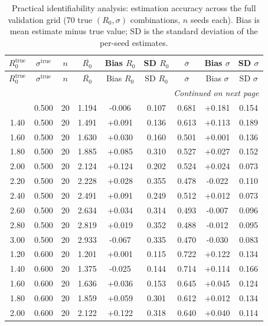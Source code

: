 \begin{longtable}{ccccccccc}
\caption{Practical identifiability analysis: estimation accuracy across the full validation grid (70 true $(R_0,\sigma)$ combinations, $n$ seeds each). Bias is mean estimate minus true value; SD is the standard deviation of the per-seed estimates.} \label{tab:s1_identifiability} \\
\hline
$R_0^{\text{true}}$ & $\sigma^{\text{true}}$ & $n$ & $\overline{R_0}$ & Bias $R_0$ & SD $R_0$ & $\overline{\sigma}$ & Bias $\sigma$ & SD $\sigma$ \\
\hline
\endfirsthead
\hline
$R_0^{\text{true}}$ & $\sigma^{\text{true}}$ & $n$ & $\overline{R_0}$ & Bias $R_0$ & SD $R_0$ & $\overline{\sigma}$ & Bias $\sigma$ & SD $\sigma$ \\
\hline
\endhead
\hline \multicolumn{9}{r}{\textit{Continued on next page}} \\
\endfoot
\hline
\endlastfoot
1.20 & 0.500 & 20 & 1.194 & -0.006 & 0.107 & 0.681 & +0.181 & 0.154 \\
1.40 & 0.500 & 20 & 1.491 & +0.091 & 0.136 & 0.613 & +0.113 & 0.189 \\
1.60 & 0.500 & 20 & 1.630 & +0.030 & 0.160 & 0.501 & +0.001 & 0.136 \\
1.80 & 0.500 & 20 & 1.885 & +0.085 & 0.310 & 0.527 & +0.027 & 0.152 \\
2.00 & 0.500 & 20 & 2.124 & +0.124 & 0.202 & 0.524 & +0.024 & 0.073 \\
2.20 & 0.500 & 20 & 2.228 & +0.028 & 0.355 & 0.478 & -0.022 & 0.110 \\
2.40 & 0.500 & 20 & 2.491 & +0.091 & 0.249 & 0.512 & +0.012 & 0.073 \\
2.60 & 0.500 & 20 & 2.634 & +0.034 & 0.314 & 0.493 & -0.007 & 0.096 \\
2.80 & 0.500 & 20 & 2.819 & +0.019 & 0.352 & 0.488 & -0.012 & 0.095 \\
3.00 & 0.500 & 20 & 2.933 & -0.067 & 0.335 & 0.470 & -0.030 & 0.083 \\
1.20 & 0.600 & 20 & 1.201 & +0.001 & 0.115 & 0.722 & +0.122 & 0.134 \\
1.40 & 0.600 & 20 & 1.375 & -0.025 & 0.144 & 0.714 & +0.114 & 0.166 \\
1.60 & 0.600 & 20 & 1.636 & +0.036 & 0.153 & 0.645 & +0.045 & 0.124 \\
1.80 & 0.600 & 20 & 1.859 & +0.059 & 0.301 & 0.612 & +0.012 & 0.134 \\
2.00 & 0.600 & 20 & 2.122 & +0.122 & 0.318 & 0.640 & +0.040 & 0.114 \\

\end{longtable}

